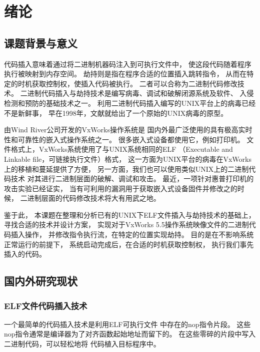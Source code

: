 \chapter{绪论}

\section{课题背景与意义}

代码插入意味着通过将二进制机器码注入到可执行文件中，
使这段代码随着程序执行被映射到内存空间。
劫持则是指在程序合适的位置插入跳转指令，
从而在特定的时机获取控制权，使插入代码被执行。
二者可以合称为二进制代码修改技术。
二进制代码插入与劫持技术是编写病毒、调试和破解闭源系统及软件、
入侵检测和预防的基础技术之一。
利用二进制代码插入编写的UNIX平台上的病毒已经不是新鲜事，
早在1998年，文献\cite{silvio}就给出了一个原始的UNIX病毒的原型。

由Wind River公司开发的VxWorks操作系统是
国内外最广泛使用的具有极高实时性和可靠性的嵌入式操作系统之一。
很多嵌入式设备都使用它，例如打印机。
文件格式上，VxWorks系统使用了与UNIX系统相同的ELF
（Executable and Linkable file，可链接执行文件）格式，
这一方面为UNIX平台的病毒在VxWorks上的移植和蔓延提供了方便，
另一方面，我们也可以使用类似UNIX上的二进制代码技术
对其进行二进制层面的破解、调试和攻击。
最近，一项针对惠普打印机的攻击实验已经证实，
当有可利用的漏洞用于获取嵌入式设备固件并修改之的时候，
二进制层面的代码修改技术将大有用武之地。


鉴于此，
本课题在整理和分析已有的UNIX下ELF文件插入与劫持技术的基础上，
寻找合适的技术并设计方案，
实现对于VxWorks 5.5操作系统映像文件的二进制代码插入操作，
并修改指令执行流，在特定的位置实现劫持。
目的是在不影响系统正常运行的前提下，
系统启动完成后，在合适的时机获取控制权，
执行我们事先插入的代码。

\section{国内外研究现状}

\subsection{ELF文件代码插入技术}

一个最简单的代码插入技术是利用ELF可执行文件
中存在的nop指令片段。
这些nop指令通常是编译器为了对齐函数起始地址而留下的。
在这些零碎的片段中写入二进制代码，可以轻松地将
代码植入目标程序中。


